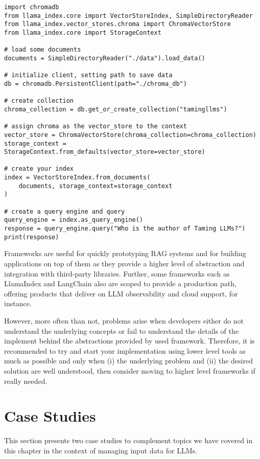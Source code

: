 \begin{verbatim}
import chromadb
from llama_index.core import VectorStoreIndex, SimpleDirectoryReader
from llama_index.vector_stores.chroma import ChromaVectorStore
from llama_index.core import StorageContext

# load some documents
documents = SimpleDirectoryReader("./data").load_data()

# initialize client, setting path to save data
db = chromadb.PersistentClient(path="./chroma_db")

# create collection
chroma_collection = db.get_or_create_collection("tamingllms")

# assign chroma as the vector_store to the context
vector_store = ChromaVectorStore(chroma_collection=chroma_collection)
storage_context = StorageContext.from_defaults(vector_store=vector_store)

# create your index
index = VectorStoreIndex.from_documents(
    documents, storage_context=storage_context
)

# create a query engine and query
query_engine = index.as_query_engine()
response = query_engine.query("Who is the author of Taming LLMs?")
print(response)
\end{verbatim}
Frameworks are useful for quickly prototyping RAG systems and for building applications on top of them as they provide a higher level of abstraction and integration with third-party libraries. Further, some frameworks such as LlamaIndex and LangChain also are scoped to provide a production path, offering products that deliver on LLM observability and cloud support, for instance. 

However, more often than not, problems arise when developers either do not understand the underlying concepts or fail to understand the details of the implement behind the abstractions provided by used framework. Therefore, it is recommended to try and start your implementation using lower level tools as much as possible and only when (i) the underlying problem and (ii) the desired solution are well understood, then consider moving to higher level frameworks if really needed.


\section{Case Studies}

This section presents two case studies to complement topics we have covered in this chapter in the context of managing input data for LLMs.

